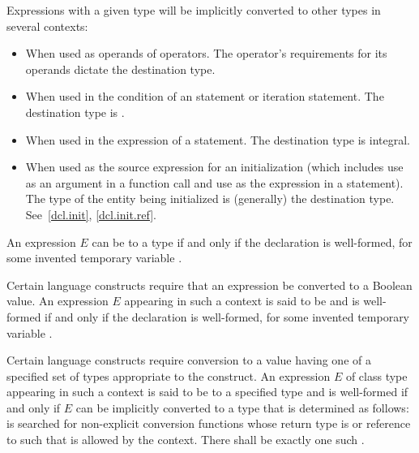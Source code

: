 \pnum
\begin{note}
Expressions with a given type will be implicitly converted to other
types in several contexts:

\begin{itemize}
\item When used as operands of operators. The operator's requirements
for its operands dictate the destination type.

\item When used in the condition of an  statement or
iteration statement. The destination type is
.

\item When used in the expression of a  statement.
The destination type is integral.

\item When used as the source expression for an initialization (which
includes use as an argument in a function call and use as the expression
in a  statement). The type of the entity being initialized
is (generally) the destination type.
See~\ref{dcl.init}, \ref{dcl.init.ref}.
\end{itemize}
\end{note}

\pnum
An expression $E$ can be
 to a type  if and only if the
declaration  is well-formed, for some invented temporary
variable .

\pnum
Certain language constructs require that an expression be converted to a Boolean
value. An expression $E$ appearing in such a context is said to be
 and is well-formed if and only if
the declaration  is well-formed, for some invented temporary
variable .

\pnum
Certain language constructs require conversion to a value having
one of a specified set of types appropriate to the construct. An
expression $E$ of class type  appearing in such a
context is said to be
%
 to a specified type  and is
well-formed if and only if $E$ can be implicitly converted to a type 
that is determined as follows:
 is searched for non-explicit conversion functions
whose return type is \cv{}  or reference to \cv{}
 such that  is allowed by the context.
There shall be exactly one such .

